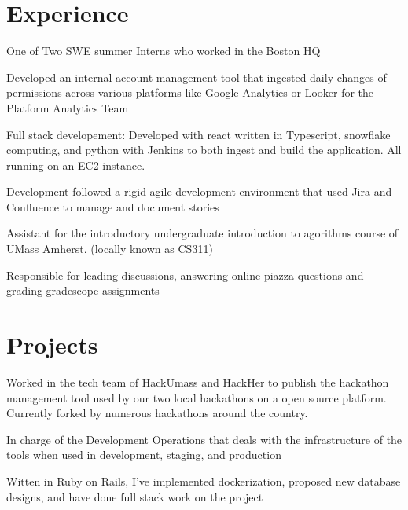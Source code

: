 \section{Experience}

\vspace{10pt}
\begin{tightemize}
    \item One of Two SWE summer Interns who worked in the Boston HQ
    \item Developed an internal account management tool that ingested daily changes of permissions across various platforms like Google Analytics or Looker for the Platform Analytics Team
    \item Full stack developement: Developed with react written in Typescript, snowflake computing, and python with Jenkins to both ingest and build the application. All running on an EC2 instance.
    \item Development followed a rigid agile development environment that used Jira and Confluence to manage and document stories
\end{tightemize}
\sectionsep

\begin{tightemize}
    \item Assistant for the introductory undergraduate introduction to agorithms course of UMass Amherst. (locally known as CS311)
    \item Responsible for leading discussions, answering online piazza questions and grading gradescope assignments
\end{tightemize}
\sectionsep

\section{Projects}
\begin{tightemize}
    \item Worked in the tech team of HackUmass and HackHer to publish the hackathon management tool used by our two local hackathons on a open source platform. Currently forked by numerous hackathons around the country.
    \item In charge of the Development Operations that deals with the infrastructure of the tools when used in development, staging, and production
    \item Witten in Ruby on Rails, I've implemented dockerization, proposed new database designs, and have done full stack work on the project 
\end{tightemize}
\sectionsep

